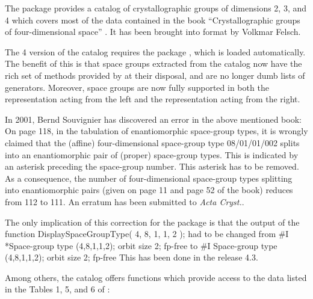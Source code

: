 \def\x{\times}



The package {\CrystCat} provides a catalog of crystallographic groups
of dimensions 2, 3, and 4 which covers most of the data contained 
in the book ``Crystallographic groups of four-dimensional space''
\cite{BBNWZ78}. It has been brought into {\GAP} format by Volkmar
Felsch.

The {\GAP} 4 version of the catalog requires the package {\Cryst},
which is loaded automatically. The benefit of this is that space groups 
extracted from the catalog now have the rich set of methods provided
by {\Cryst} at their disposal, and are no longer dumb lists of generators.
Moreover, space groups are now fully supported in both the representation
acting from the left and the representation acting from the right.

In 2001, Bernd Souvignier has discovered an error in the above mentioned
book: On page 118, in the tabulation of enantiomorphic space-group types,
it is wrongly claimed that the (affine) four-dimensional space-group
type 08/01/01/002 splits into an enantiomorphic pair of (proper)
space-group types. This is indicated by an asterisk preceding the
space-group number. This asterisk has to be removed. As a
consequence, the number of four-dimensional space-group types
splitting into enantiomorphic pairs (given on page 11 and page 52
of the book) reduces from 112 to 111. An erratum has been submitted
to {\it Acta Cryst.}.

The only implication of this correction for the package {\CrystCat}
is that the output of the function
\begintt
DisplaySpaceGroupType( 4, 8, 1, 1, 2 );
\endtt
had to be changed from
\begintt
#I    *Space-group type (4,8,1,1,2); orbit size 2; fp-free
\endtt
to
\begintt
#I     Space-group type (4,8,1,1,2); orbit size 2; fp-free
\endtt
This has been done in the release {\GAP} 4.3.


Among others, the catalog offers functions which provide access to the
data listed in the Tables 1, 5, and 6 of \cite{BBNWZ78}:

